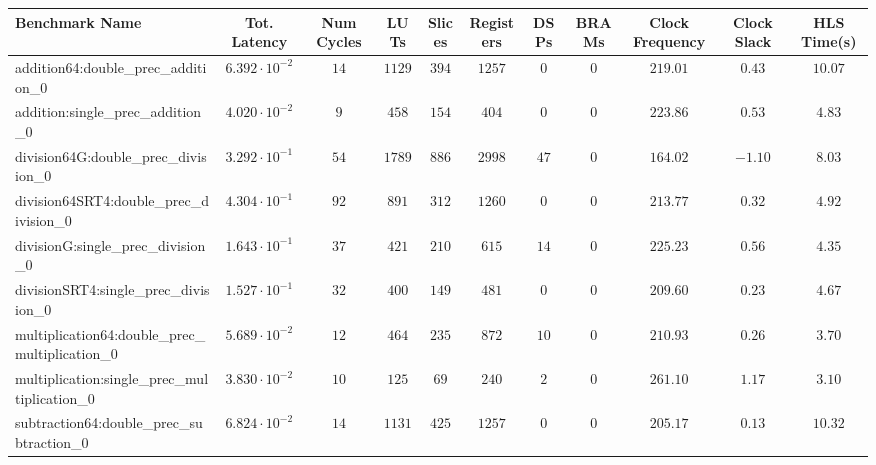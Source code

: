 \begin{tabular}{|l|c|c|c|c|c|c|c|c|c|c|}
\hline
Benchmark Name                                   & Tot. Latency            & Num Cycles & LUTs     & Slices   & Registers & DSPs   & BRAMs & Clock Frequency & Clock Slack & HLS Time(s) \\
\hline
addition64:double\_prec\_addition\_0             & $ 6.392 \cdot 10^{-2} $ & $ 14     $ & $ 1129 $ & $ 394  $ & $ 1257  $ & $ 0  $ & $ 0 $ & $ 219.01      $ & $ 0.43    $ & $ 10.07   $ \\
addition:single\_prec\_addition\_0               & $ 4.020 \cdot 10^{-2} $ & $ 9      $ & $ 458  $ & $ 154  $ & $ 404   $ & $ 0  $ & $ 0 $ & $ 223.86      $ & $ 0.53    $ & $ 4.83    $ \\
division64G:double\_prec\_division\_0            & $ 3.292 \cdot 10^{-1} $ & $ 54     $ & $ 1789 $ & $ 886  $ & $ 2998  $ & $ 47 $ & $ 0 $ & $ 164.02      $ & $ -1.10   $ & $ 8.03    $ \\
division64SRT4:double\_prec\_division\_0         & $ 4.304 \cdot 10^{-1} $ & $ 92     $ & $ 891  $ & $ 312  $ & $ 1260  $ & $ 0  $ & $ 0 $ & $ 213.77      $ & $ 0.32    $ & $ 4.92    $ \\
divisionG:single\_prec\_division\_0              & $ 1.643 \cdot 10^{-1} $ & $ 37     $ & $ 421  $ & $ 210  $ & $ 615   $ & $ 14 $ & $ 0 $ & $ 225.23      $ & $ 0.56    $ & $ 4.35    $ \\
divisionSRT4:single\_prec\_division\_0           & $ 1.527 \cdot 10^{-1} $ & $ 32     $ & $ 400  $ & $ 149  $ & $ 481   $ & $ 0  $ & $ 0 $ & $ 209.60      $ & $ 0.23    $ & $ 4.67    $ \\
multiplication64:double\_prec\_multiplication\_0 & $ 5.689 \cdot 10^{-2} $ & $ 12     $ & $ 464  $ & $ 235  $ & $ 872   $ & $ 10 $ & $ 0 $ & $ 210.93      $ & $ 0.26    $ & $ 3.70    $ \\
multiplication:single\_prec\_multiplication\_0   & $ 3.830 \cdot 10^{-2} $ & $ 10     $ & $ 125  $ & $ 69   $ & $ 240   $ & $ 2  $ & $ 0 $ & $ 261.10      $ & $ 1.17    $ & $ 3.10    $ \\
subtraction64:double\_prec\_subtraction\_0       & $ 6.824 \cdot 10^{-2} $ & $ 14     $ & $ 1131 $ & $ 425  $ & $ 1257  $ & $ 0  $ & $ 0 $ & $ 205.17      $ & $ 0.13    $ & $ 10.32   $ \\

\end{tabular}
